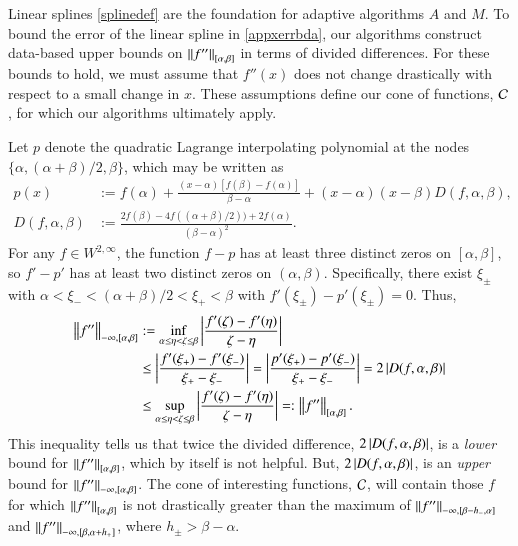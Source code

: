 \documentclass[review]{elsarticle}
\theoremstyle{definition}
\renewcommand{\cw}{W}
\begin{document}
Linear splines \eqref{splinedef} are the foundation for adaptive algorithms $A$
and $M$. To bound the error of the linear spline in \eqref{appxerrbda}, our
algorithms construct data-based upper bounds on $\norm[{[\alpha, \beta]}]{f''}$
in terms of divided differences. For these bounds to hold, we must assume that
$f''(x)$ does not change drastically with respect to a small change in $x$.
These assumptions define our cone of functions, $\cc$, for which our algorithms
ultimately apply.

Let $p$ denote the quadratic Lagrange interpolating polynomial at the nodes
$\{\alpha, (\alpha + \beta)/2, \beta\}$, which may be written as
\begin{align}
\nonumber
   p(x) & := f(\alpha) + \frac{(x-\alpha)[f(\beta) - f(\alpha)]}{\beta - \alpha}  +
   (x-\alpha)(x-\beta) D(f,\alpha,\beta),
\\ D(f,\alpha,\beta) &:= \frac{2f(\beta) - 4f((\alpha + \beta)/2))
	+ 2f(\alpha)}{(\beta - \alpha)^2}. \label{divdiffdef}
\end{align}
For any $f \in \cw^{2,\infty}$, the function $f - p$ has at least three distinct
zeros on $[\alpha,\beta]$, so $f' - p'$ has at least two distinct zeros on
$(\alpha,\beta)$.  Specifically, there exist $\xi_\pm$ with $\alpha < \xi_- < (\alpha +
\beta)/2 < \xi_+ < \beta$ with $f'(\xi_\pm) - p'(\xi_{\pm}) = 0$. Thus,
\begin{align}
     \norm[-\infty,{[\alpha,\beta]}]{f''}
   & := \inf_{\alpha \le \eta < \zeta \le \beta} \abs{\frac{f'(\zeta) - f'(\eta)}{\zeta - \eta}}
   \nonumber
\\ & \le \abs{\frac{f'(\xi_+) - f'(\xi_-)}{\xi_+ - \xi_-}}
   = \abs{\frac{p'(\xi_+) - p'(\xi_-)}{\xi_+ - \xi_-}} = 2 \abs{D(f,\alpha,\beta)}  \nonumber
\\ & \le \sup_{\alpha \le \eta < \zeta \le \beta} \abs{\frac{f'(\zeta) - f'(\eta)}{\zeta - \eta}}
=: \norm[{[\alpha,\beta]}]{f''}. \label{NDDbdm}
\end{align}
This inequality tells us that twice the divided difference,
$2\abs{D(f,\alpha,\beta)}$, is a \emph{lower} bound for
$\norm[{[\alpha,\beta]}]{f''}$, which by itself is not helpful. But,
$2\abs{D(f,\alpha,\beta)}$, is an \emph{upper} bound for
$\norm[-\infty,{[\alpha,\beta]}]{f''}$. The cone of interesting functions,
$\cc$, will contain those $f$ for which $\norm[{[\alpha,\beta]}]{f''}$ is not
drastically greater than the maximum of $\norm[-\infty,{[\beta - h_-,
\alpha]}]{f''}$ and $\norm[-\infty,{[\beta, \alpha+ h_+]}]{f''}$, where $h_{\pm} > \beta -
\alpha$.
\end{document}
